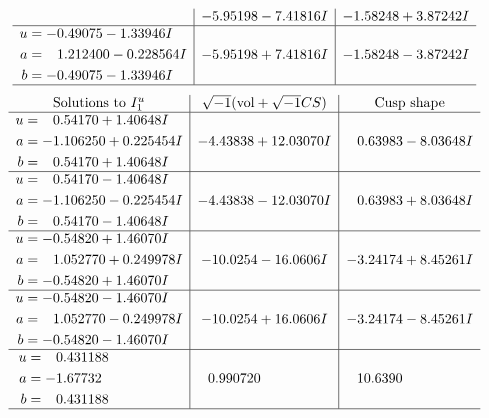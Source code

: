 \documentclass[1p]{elsarticle_modified}
\theoremstyle{definition}
\newcommand{\I}{\sqrt{-1}}
\begin{document}
$$\begin{array}{c|c|c}
 & -5.95198 - 7.41816 I & -1.58248 + 3.87242 I \\ \hline\begin{aligned}
u &= -0.49075 - 1.33946 I \\
a &= \phantom{-}1.212400 - 0.228564 I \\
b &= -0.49075 - 1.33946 I\end{aligned}
 & -5.95198 + 7.41816 I & -1.58248 - 3.87242 I\\
 \hline 
 \end{array}$$\newpage$$\begin{array}{c|c|c}  
\text{Solutions to }I^u_{1}& \I (\text{vol} + \sqrt{-1}CS) & \text{Cusp shape}\\
 \hline 
\begin{aligned}
u &= \phantom{-}0.54170 + 1.40648 I \\
a &= -1.106250 + 0.225454 I \\
b &= \phantom{-}0.54170 + 1.40648 I\end{aligned}
 & -4.43838 + 12.03070 I & \phantom{-}0.63983 - 8.03648 I \\ \hline\begin{aligned}
u &= \phantom{-}0.54170 - 1.40648 I \\
a &= -1.106250 - 0.225454 I \\
b &= \phantom{-}0.54170 - 1.40648 I\end{aligned}
 & -4.43838 - 12.03070 I & \phantom{-}0.63983 + 8.03648 I \\ \hline\begin{aligned}
u &= -0.54820 + 1.46070 I \\
a &= \phantom{-}1.052770 + 0.249978 I \\
b &= -0.54820 + 1.46070 I\end{aligned}
 & -10.0254 - 16.0606 I & -3.24174 + 8.45261 I \\ \hline\begin{aligned}
u &= -0.54820 - 1.46070 I \\
a &= \phantom{-}1.052770 - 0.249978 I \\
b &= -0.54820 - 1.46070 I\end{aligned}
 & -10.0254 + 16.0606 I & -3.24174 - 8.45261 I \\ \hline\begin{aligned}
u &= \phantom{-}0.431188\phantom{ +0.000000I} \\
a &= -1.67732\phantom{ +0.000000I} \\
b &= \phantom{-}0.431188\phantom{ +0.000000I}\end{aligned}
 & \phantom{-}0.990720\phantom{ +0.000000I} & \phantom{-}10.6390\phantom{ +0.000000I}\\
 \hline 
 \end{array}$$\newpage\newpage\renewcommand{\arraystretch}{1}
\end{document}
